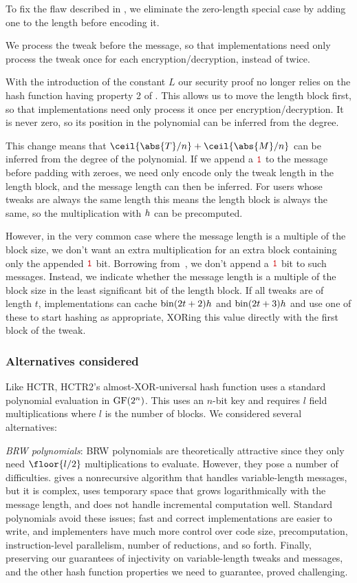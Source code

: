 \documentclass[hctr2.tex]{subfiles}
\begin{document}
To fix the flaw described in \cite{kumarhctr},
we eliminate the zero-length special case
by adding one to the length before encoding it.

We process the tweak before the message, so that implementations need only
process the tweak once for each encryption/decryption, instead of twice.

With the introduction of the constant \(L\)
our security proof no longer relies on the hash function
having property 2 of \cite[Section~3.3]{hctr}.
This allows us to move the length block first, so
that implementations need only process it once per encryption/decryption.
It is never zero, so its position in the
polynomial can be inferred from the degree.

This change means that \(\ceil{\abs{T}/n} + \ceil{\abs{M}/n}\)
can be inferred from the degree of the polynomial.  
If we append a \(\bini\) to the message before padding with zeroes,
we need only encode only the tweak length in the length block,
and the message length can then be inferred.
For users whose tweaks are always the same length
this means the length block is always the same, 
so the multiplication with \(h\) can be
precomputed.

However, in the very common case where 
the message length is a multiple of the block size,
we don't want an extra multiplication
for an extra block containing only the appended \(\bini\) bit.
Borrowing from~\cite{xcbc},
we don't append a \(\bini\) bit to such messages.
Instead, we indicate whether
the message length is a multiple of the block size
in the least significant bit of the length block.
If all tweaks are of length \(t\), implementations can cache
\(\operatorname{bin}(2t + 2)h\) and \(\operatorname{bin}(2t + 3)h\)
and use one of these to start hashing as appropriate,
XORing this value directly with the first block of the tweak.

\subsubsection{Alternatives considered}

Like HCTR, HCTR2's almost-XOR-universal hash function uses a standard polynomial
evaluation in $\operatorname{GF}(2^n)$. This uses an $n$-bit key and requires $l$ field
multiplications where $l$ is the number of blocks.
We considered several alternatives:

\emph{BRW polynomials}: BRW polynomials\cite{pema}\cite{heh2} are theoretically
attractive since they only need \(\floor{l/2}\) multiplications
to evaluate. However, they pose a number of difficulties. \cite{brweval} gives a
nonrecursive algorithm that handles variable-length messages, but it is complex,
uses temporary space that grows logarithmically with the message length,
and does not handle incremental computation well.
Standard polynomials avoid these issues;
fast and correct implementations are easier to write,
and implementers have much more control over
code size, precomputation, instruction-level
parallelism, number of reductions, and so forth.
Finally, preserving our guarantees of injectivity on variable-length
tweaks and messages, and the other hash function properties we need
to guarantee, proved challenging.
\end{document}
